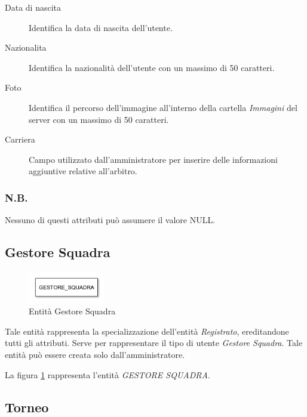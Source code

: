 		\begin{description}
			
			\item[Data di nascita]
			Identifica la data di nascita dell'utente.
			
			\item[Nazionalita]
			Identifica la nazionalità dell'utente con un massimo di 50 caratteri.
			
			\item[Foto]
			Identifica il percorso dell'immagine all'interno della cartella \emph{Immagini} del server con un massimo di 50 caratteri.
			
			\item[Carriera]
			Campo utilizzato dall'amministratore per inserire delle informazioni aggiuntive relative all'arbitro.
			
		\end{description}
		
		\subsubsection*{N.B.}
		Nessuno di questi attributi può assumere il valore NULL.
	
	\subsection{Gestore Squadra}
	
		\begin{figure}[h]
			\centering
			\includegraphics[width=0.3\textwidth]
			{immagini/05-gestore-squadra}
			
			\caption{Entità Gestore Squadra}
			\label{entita-gestore-squadra}
		\end{figure}
		
		Tale entità rappresenta la specializzazione dell'entità \emph{Registrato}, ereditandone tutti gli attributi. Serve per rappresentare il tipo di utente \emph{Gestore Squadra}. Tale entità può essere creata solo dall'amministratore.
		
		La figura \ref{entita-gestore-squadra} rappresenta l'entità \emph{GESTORE SQUADRA}.
	
	\subsection{Torneo}
	
